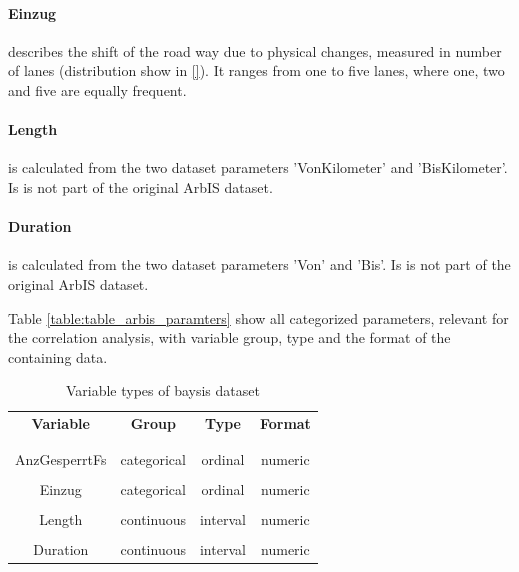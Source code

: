 \paragraph{Einzug} describes the shift of the road way due to physical changes, measured in number of lanes (distribution show in \autoref{}). It ranges from one to five lanes, where one, two and five are equally frequent. 

\paragraph{Length} is calculated from the two dataset parameters 'VonKilometer' and 'BisKilometer'. Is is not part of the original ArbIS dataset.

\paragraph{Duration} is calculated from the two dataset parameters 'Von' and 'Bis'. Is is not part of the original ArbIS dataset.

\bigskip

Table \autoref{table:table_arbis_paramters} show all categorized parameters, relevant for the correlation analysis, with variable group, type and the format of the containing data.
	
\begin{table}[ht]
	\centering
    \begin{tabular}{c|c|c|c}
		\textbf{Variable} 	& \textbf{Group} 	& \textbf{Type} 		& \textbf{Format} \\
		\\[-1em]
		\hline
		\\[-1em]
		AnzGesperrtFs  	& categorical 	& ordinal 	& numeric\\
		\hline
		\\[-1em]
		Einzug  		& categorical 	& ordinal 	& numeric\\
		\hline
		\\[-1em]
		Length  		& continuous 	& interval 	& numeric\\
		\hline
		\\[-1em]
		Duration  		& continuous 	& interval 	& numeric\\
	\end{tabular}
	\caption{Variable types of \acrshort{baysis} dataset}
	\label{table:table_arbis_paramters}
\end{table}
